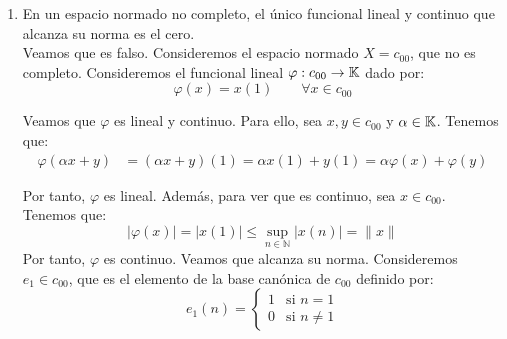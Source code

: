 \documentclass[12pt]{article}
\begin{document}
\begin{ejercicio}
\begin{enumerate}
                Claramente, $\Phi_t$ es lineal, y además es continuo, ya que:
                \begin{equation*}
                    |\Phi_t(f)| = |f(t) - f(-t)| \leq |f(t)| + |f(-t)| \leq 2\|f\|
                \end{equation*}

                Por tanto, $\Phi_t$ es lineal y continuo. Además:
                \begin{align*}
                    \ker(\Phi_t) &= \{f\in C[-1,1] : \Phi_t(f) = 0\} = \{f\in C[-1,1] : f(t) - f(-t) = 0\} =\\&= \{f\in C[-1,1] : f(t) = f(-t)\}
                \end{align*}
                
                Por tanto:
                \begin{equation*}
                    X=\bigcap_{t\in [0,1]} \ker(\Phi_t)
                \end{equation*}

                Como la intersección arbitraria de cerrados es cerrado, $X$ es cerrado en $C[-1,1]$. Por tanto, puesto que $X\neq C[-1,1]$, $X$ no puede ser denso en $C[-1,1]$.
            \item En un espacio normado no completo, el único funcional lineal y continuo que alcanza su norma es el cero.\\
            
            Veamos que es falso. Consideremos el espacio normado $X = c_{00}$, que no es completo. Consideremos el funcional lineal $\varphi: c_{00}\to \mathbb{K}$ dado por:
            \begin{equation*}
                \varphi(x) = x(1) \qquad \forall x\in c_{00}
            \end{equation*}

            Veamos que $\varphi$ es lineal y continuo. Para ello, sea $x,y\in c_{00}$ y $\alpha\in \mathbb{K}$. Tenemos que:
            \begin{align*}
                \varphi(\alpha x + y) &= (\alpha x + y)(1) = \alpha x(1) + y(1) = \alpha \varphi(x) + \varphi(y)
            \end{align*}

            Por tanto, $\varphi$ es lineal. Además, para ver que es continuo, sea $x\in c_{00}$. Tenemos que:
            \begin{equation*}
                |\varphi(x)| = |x(1)| \leq \sup_{n\in \mathbb{N}} |x(n)| = \|x\|
            \end{equation*}
            Por tanto, $\varphi$ es continuo. Veamos que alcanza su norma. Consideremos $e_1\in c_{00}$, que es el elemento de la base canónica de $c_{00}$ definido por:
            \begin{equation*}
                e_1(n) = \begin{cases}
                    1 & \text{si } n = 1\\
                    0 & \text{si } n\neq 1
                \end{cases}
            \end{equation*}


\end{enumerate}
\end{ejercicio}
\end{document}
